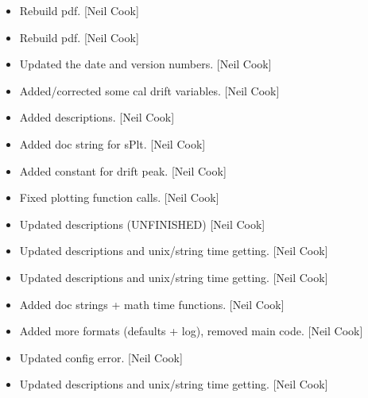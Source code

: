 \documentclass[a4paper,10pt,english]{report}
\begin{document}
\begin{itemize}
\item {} 
Rebuild pdf. {[}Neil Cook{]}

\item {} 
Rebuild pdf. {[}Neil Cook{]}

\item {} 
Updated the date and version numbers. {[}Neil Cook{]}

\item {} 
Added/corrected some cal drift variables. {[}Neil Cook{]}

\item {} 
Added descriptions. {[}Neil Cook{]}

\item {} 
Added doc string for sPlt. {[}Neil Cook{]}

\item {} 
Added constant for drift peak. {[}Neil Cook{]}

\item {} 
Fixed plotting function calls. {[}Neil Cook{]}

\item {} 
Updated descriptions (UNFINISHED) {[}Neil Cook{]}

\item {} 
Updated descriptions and unix/string time getting. {[}Neil Cook{]}

\item {} 
Updated descriptions and unix/string time getting. {[}Neil Cook{]}

\item {} 
Added doc strings + math time functions. {[}Neil Cook{]}

\item {} 
Added more formats (defaults + log), removed main code. {[}Neil Cook{]}

\item {} 
Updated config error. {[}Neil Cook{]}

\item {} 
Updated descriptions and unix/string time getting. {[}Neil Cook{]}

\end{itemize}
\end{document}
